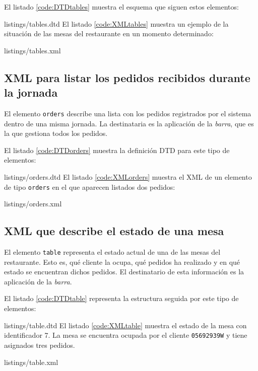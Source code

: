 El listado \ref{code:DTDtables} muestra el esquema que siguen estos elementos:

{listings/tables.dtd}
El listado \ref{code:XMLtables} muestra un ejemplo de la situación de las
mesas del restaurante en un momento determinado:

{listings/tables.xml}

\subsection{\acs{XML} para listar los pedidos recibidos durante la jornada}
El elemento \texttt{orders} describe una lista con los pedidos registrados
por el sistema dentro de una misma jornada. La destinataria es la aplicación
de la \emph{barra}, que es la que gestiona todos los pedidos.

El listado \ref{code:DTDorders} muestra la definición \acs{DTD} para este tipo 
de elementos:

{listings/orders.dtd}
El listado \ref{code:XMLorders} muestra el \acs{XML} de un elemento de tipo
\texttt{orders} en el que aparecen listados dos pedidos:

{listings/orders.xml}

\subsection{\acs{XML} que describe el estado de una mesa}
El elemento \texttt{table} representa el estado actual de una de las mesas
del restaurante. Esto es, qué cliente la ocupa, qué pedidos ha realizado y
en qué estado se encuentran dichos pedidos. El destinatario de esta información
es la aplicación de la \emph{barra}.

El listado \ref{code:DTDtable} representa la estructura seguida por este tipo 
de elementos:

{listings/table.dtd}
El listado \ref{code:XMLtable} muestra el estado de la mesa con identificador
7. La mesa se encuentra ocupada por el cliente \texttt{05692939W} y tiene
asignados tres pedidos.

{listings/table.xml}

